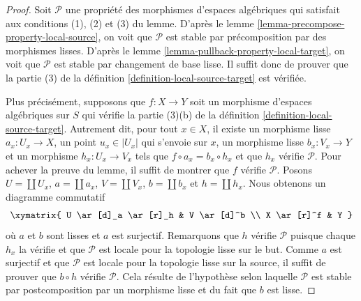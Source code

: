 \begin{proof}
Soit $\mathcal{P}$ une propriété des morphismes d'espaces algébriques qui
satisfait aux conditions (1), (2) et (3) du lemme. D'après le
lemme \ref{lemma-precompose-property-local-source},
on voit que $\mathcal{P}$ est stable par précomposition par des
morphismes lisses. D'après le
lemme \ref{lemma-pullback-property-local-target},
on voit que $\mathcal{P}$ est stable par changement de base lisse.
Il suffit donc de prouver que la partie (3) de la
définition \ref{definition-local-source-target}
est vérifiée.

\medskip\noindent
Plus précisément, supposons que $f : X \to Y$ soit un morphisme
d'espaces algébriques sur $S$ qui vérifie la
partie (3)(b) de la définition \ref{definition-local-source-target}.
Autrement dit, pour tout $x \in X$, il existe un morphisme lisse
$a_x : U_x \to X$, un point $u_x \in |U_x|$ qui s'envoie sur $x$,
un morphisme lisse $b_x : V_x \to Y$ et un morphisme $h_x : U_x \to V_x$
tels que $f \circ a_x = b_x \circ h_x$ et que $h_x$ vérifie $\mathcal{P}$.
Pour achever la preuve du lemme, il suffit de montrer que $f$ vérifie $\mathcal{P}$.
Posons $U = \coprod U_x$, $a = \coprod a_x$, $V = \coprod V_x$,
$b = \coprod b_x$ et $h = \coprod h_x$. Nous obtenons un
diagramme commutatif
$$
\xymatrix{
U \ar[d]_a \ar[r]_h & V \ar[d]^b \\
X \ar[r]^f & Y
}
$$
où $a$ et $b$ sont lisses et $a$ est surjectif. Remarquons que $h$ vérifie $\mathcal{P}$
puisque chaque $h_x$ la vérifie et que $\mathcal{P}$ est locale pour la topologie lisse sur le but.
Comme $a$ est surjectif et que $\mathcal{P}$ est locale pour la topologie lisse sur la source,
il suffit de prouver que $b \circ h$ vérifie $\mathcal{P}$.
Cela résulte de l'hypothèse selon laquelle $\mathcal{P}$ est stable par
postcomposition par un morphisme lisse et du fait que $b$ est lisse.
\end{proof}

